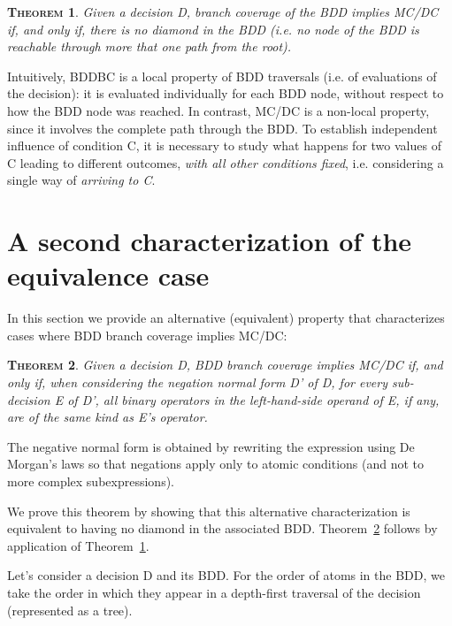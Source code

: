 \documentclass[a4paper,12pt,twoside]{article}
\newtheorem{theorem}{\textsc{Theorem}}
\begin{document}
\begin{theorem}
  \label{thm:no-diamond}
  Given a decision D, branch coverage of the BDD implies MC/DC if,
  and only if, there is no diamond in the BDD (i.e.  no node of the
  BDD is reachable through more that one path from the root).
\end{theorem}

Intuitively, BDDBC is a local property of BDD traversals (i.e. of evaluations
of the decision): it is evaluated individually for each BDD node, without
respect to how the BDD node was reached. In contrast, MC/DC is a non-local
property, since it involves the complete path through the BDD. To establish
independent influence of condition C, it is necessary to study what happens
for two values of C leading to different outcomes, \emph{with all other
conditions fixed}, i.e. considering a single way of \emph{arriving to C}.

\section{A second characterization of the equivalence case}

In this section we provide an alternative (equivalent) property
that characterizes cases where BDD branch coverage implies MC/DC:

\begin{theorem}
  \label{thm:lhs-same-operator}
  Given a decision D, BDD branch coverage implies MC/DC if, and only if, when
  considering the negation normal form D' of D, for every sub-decision E of D',
  all binary operators in the left-hand-side operand of E, if any, are of the
  same kind as E's operator.
\end{theorem}

The negative normal form is obtained by rewriting the expression using
De Morgan's laws so that negations apply only to atomic conditions (and not
to more complex subexpressions).

We prove this theorem by showing that this alternative characterization is
equivalent to having no diamond in the associated BDD.
Theorem~\ref{thm:lhs-same-operator} follows by application of
Theorem~\ref{thm:no-diamond}.

Let's consider a decision D and its BDD. For the order of atoms in the
BDD, we take the order in which they appear in a depth-first traversal
of the decision (represented as a tree).

\end{document}
